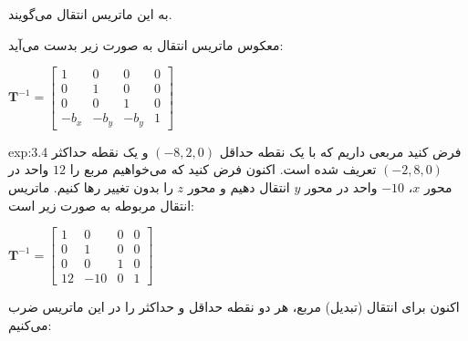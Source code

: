 {\begin{spacing}{1.5}
        به این ماتریس انتقال می‌گویند.

        معکوس ماتریس انتقال به صورت زیر بدست می‌آید:

        \begin{center}
            $\textbf{T}^{-1}=\begin{bmatrix}
                                 1      & 0      & 0      & 0 \\
                                 0      & 1      & 0      & 0 \\
                                 0      & 0      & 1      & 0 \\
                                 -b_{x} & -b_{y} & -b_{y} & 1
            \end{bmatrix}$
        \end{center}

        \begin{example}{exp:3.4}
            \Large
            فرض کنید مربعی داریم که با یک نقطه حداقل $(-8, 2, 0)$ و یک نقطه حداکثر $(-2, 8, 0)$ تعریف شده است.
            اکنون فرض کنید که می‌خواهیم مربع را $12$ واحد در محور $x$، $-10$ واحد در محور $y$ انتقال دهیم
            و محور $z$ را بدون تغییر رها کنیم.
            ماتریس انتقال مربوطه به صورت زیر است:

            \begin{center}
                $\textbf{T}^{-1}=\begin{bmatrix}
                                     1  & 0   & 0 & 0 \\
                                     0  & 1   & 0 & 0 \\
                                     0  & 0   & 1 & 0 \\
                                     12 & -10 & 0 & 1
                \end{bmatrix}$
            \end{center}

            اکنون برای انتقال (تبدیل) مربع، هر دو نقطه حداقل و حداکثر را در این ماتریس ضرب می‌کنیم:


\end{example}
\end{spacing}}
